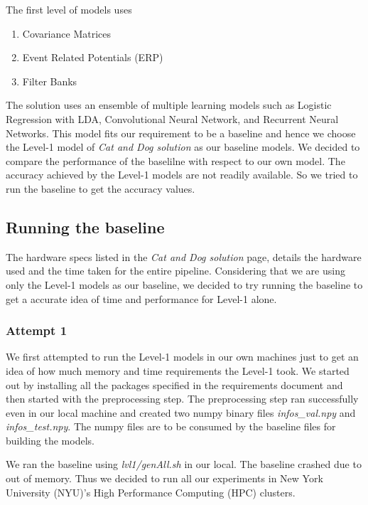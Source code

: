 \documentclass[final,leqno,onefignum,onetabnum]{siamltexmm}
\begin{document}
The first level of models uses 

\begin{enumerate}
  \item Covariance Matrices
  \item Event Related Potentials (ERP)
  \item Filter Banks
\end{enumerate}

The solution uses an ensemble of multiple learning models such as Logistic Regression with LDA, Convolutional Neural Network, and Recurrent Neural Networks.  
This model fits our requirement to be a baseline and hence we choose the Level-1 model of \textit{Cat and Dog solution} as our baseline models.
We decided to compare the performance of the baselilne with respect to our own model.
The accuracy achieved by the Level-1 models are not readily available.  So we tried to run the baseline to get the accuracy values.

\subsection{Running the baseline}
The hardware specs listed in the \textit{Cat and Dog solution} page, details the hardware used and the time taken for the entire pipeline.  
Considering that we are using only the Level-1 models as our baseline, we decided to try running the baseline to get a accurate idea of time and performance for Level-1 alone.

\subsubsection{Attempt 1}
We first attempted to run the Level-1 models in our own machines just to get an idea of how much memory and time requirements the Level-1 took.
We started out by installing all the packages specified in the requirements document and then started with the preprocessing step.
The preprocessing step ran successfully even in our local machine and created two numpy binary files \textit{infos\_val.npy} and \textit{infos\_test.npy}.
The numpy files are to be consumed by the baseline files for building the models.


We ran the baseline using \textit{lvl1/genAll.sh} in our local.  The baseline crashed due to out of memory.  Thus we decided to run all our experiments in New York University (NYU)'s High Performance Computing (HPC) clusters\cite{website:nyuhpc}.
\end{document}
